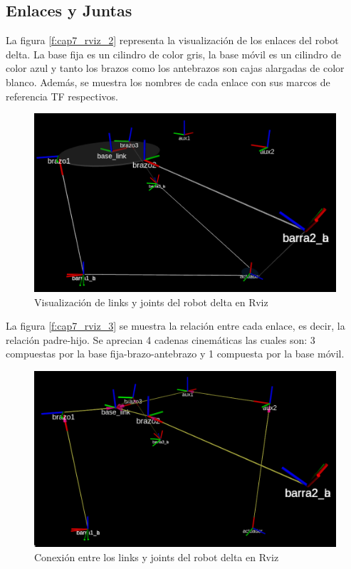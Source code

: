 \newpage

    \subsection{Enlaces y Juntas}\label{enalcesyjuntas_cap7}
        La figura \eqref{f:cap7_rviz_2} representa la visualización de los enlaces del robot delta. La base fija es un cilindro de color gris, la base móvil es un cilindro de color azul y tanto los brazos como los antebrazos son cajas alargadas de color blanco. Además, se muestra los nombres de cada enlace con sus marcos de referencia TF respectivos.
        \begin{figure}[h]
            \centering
            \includegraphics[width=0.8\linewidth]{Main/Chapter7/Images7/rviz_2.png}
            \caption{Visualización de links y joints del robot delta en Rviz}
            \label{f:cap7_rviz_2}
        \end{figure}  
        
    La figura \eqref{f:cap7_rviz_3} se muestra la relación entre cada enlace, es decir, la relación padre-hijo. Se aprecian 4 cadenas cinemáticas las cuales son: 3 compuestas por la base fija-brazo-antebrazo y 1 compuesta por la base móvil.    
    \begin{figure}[h]
            \centering
            \includegraphics[width=0.8\linewidth]{Main/Chapter7/Images7/rviz_3.png}
            \caption{Conexión entre los links y joints del robot delta en Rviz}
            \label{f:cap7_rviz_3}
        \end{figure}  

